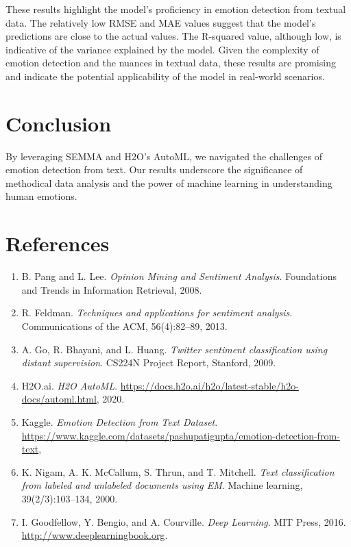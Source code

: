 \documentclass[12pt]{article}
\begin{document}
These results highlight the model's proficiency in emotion detection from textual data. The relatively low RMSE and MAE values suggest that the model's predictions are close to the actual values. The R-squared value, although low, is indicative of the variance explained by the model. Given the complexity of emotion detection and the nuances in textual data, these results are promising and indicate the potential applicability of the model in real-world scenarios.


\section{Conclusion}
By leveraging SEMMA and H2O's AutoML, we navigated the challenges of emotion detection from text. Our results underscore the significance of methodical data analysis and the power of machine learning in understanding human emotions.

\section{References}
\begin{enumerate}
    \item B. Pang and L. Lee. \textit{Opinion Mining and Sentiment Analysis}. Foundations and Trends in Information Retrieval, 2008.
    \item R. Feldman. \textit{Techniques and applications for sentiment analysis}. Communications of the ACM, 56(4):82–89, 2013.
    \item A. Go, R. Bhayani, and L. Huang. \textit{Twitter sentiment classification using distant supervision}. CS224N Project Report, Stanford, 2009.
    \item H2O.ai. \textit{H2O AutoML}. \url{https://docs.h2o.ai/h2o/latest-stable/h2o-docs/automl.html}, 2020.
    \item Kaggle. \textit{Emotion Detection from Text Dataset}. \url{https://www.kaggle.com/datasets/pashupatigupta/emotion-detection-from-text},
    \item K. Nigam, A. K. McCallum, S. Thrun, and T. Mitchell. \textit{Text classification from labeled and unlabeled documents using EM}. Machine learning, 39(2/3):103–134, 2000.
    \item I. Goodfellow, Y. Bengio, and A. Courville. \textit{Deep Learning}. MIT Press, 2016. \url{http://www.deeplearningbook.org}.
\end{enumerate}
\end{document}
